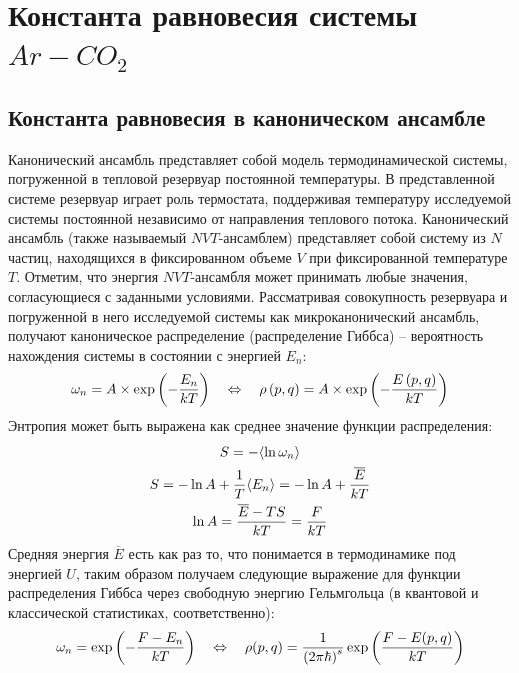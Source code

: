 \section{Константа равновесия системы $Ar-CO_2$}

\subsection{Константа равновесия в каноническом ансамбле \cite{keszei, landau2}}

Канонический ансамбль представляет собой модель термодинамической системы, погруженной в тепловой резервуар постоянной температуры. В представленной системе резервуар играет роль термостата, поддерживая температуру исследуемой системы постоянной независимо от направления теплового потока. Канонический ансамбль (также называемый $NVT$-ансамблем) представляет собой систему из $N$ частиц, находящихся в фиксированном объеме $V$ при фиксированной температуре $T$. Отметим, что энергия $NVT$-ансамбля может принимать любые значения, согласующиеся с заданными условиями. Рассматривая совокупность резервуара и погруженной в него исследуемой системы как микроканонический ансамбль, получают каноническое распределение (распределение Гиббса) -- вероятность нахождения системы в состоянии с энергией $E_n$:
\vverh
\begin{gather}
	\omega_n = A \times \exp \left( - \frac{E_n}{kT} \right) \quad \Leftrightarrow \quad \rho \left( p, q \right) = A \times \exp \left( - \frac{E \left( p, q \right)}{kT} \right) \notag
\end{gather}
Энтропия может быть выражена как среднее значение функции распределения:
\vverh
\begin{gather}
	S = - \langle \ln \omega_n \rangle \notag \\
	S = - \ln A + \frac{1}{T} \langle E_n \rangle = - \ln A + \frac{\overline{E}}{kT} \notag \\
	\ln A = \frac{\overline{E} - TS}{kT} = \frac{F}{kT} \notag 
\end{gather}
Средняя энергия $\overline{E}$ есть как раз то, что понимается в термодинамике под энергией $U$, таким образом получаем следующие выражение для функции распределения Гиббса через свободную энергию Гельмгольца (в квантовой и классической статистиках, соответственно):
\vverh
\begin{gather}
	\omega_n = \exp \left( - \frac{F - E_n}{kT} \right) \quad \Leftrightarrow \quad \rho(p, q) = \frac{1}{\left( 2 \pi \hbar \right)^{s}} \exp \left( \frac{F - E(p, q)}{kT} \right) \notag
\end{gather}

